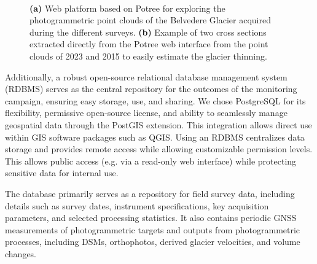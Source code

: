 \begin{figure}[p]
  \centering
     \\
    \caption{\textbf{(a)} Web platform based on Potree for exploring the photogrammetric point clouds of the Belvedere Glacier acquired during the different surveys. \textbf{(b)} Example of two cross sections extracted directly from the Potree web interface from the point clouds of 2023 and 2015 to easily estimate the glacier thinning.}
    \label{fig:3:potree}
\end{figure}

Additionally, a robust open-source relational database management system (RDBMS) serves as the central repository for the outcomes of the monitoring campaign, ensuring easy storage, use, and sharing. 
We chose PostgreSQL for its flexibility, permissive open-source license, and ability to seamlessly manage geospatial data through the PostGIS extension. 
This integration allows direct use within GIS software packages such as QGIS. 
Using an RDBMS centralizes data storage and provides remote access while allowing customizable permission levels. 
This allows public access (e.g. via a read-only web interface) while protecting sensitive data for internal use. 

The database primarily serves as a repository for field survey data, including details such as survey dates, instrument specifications, key acquisition parameters, and selected processing statistics. 
It also contains periodic GNSS measurements of photogrammetric targets and outputs from photogrammetric processes, including DSMs, orthophotos, derived glacier velocities, and volume changes.

